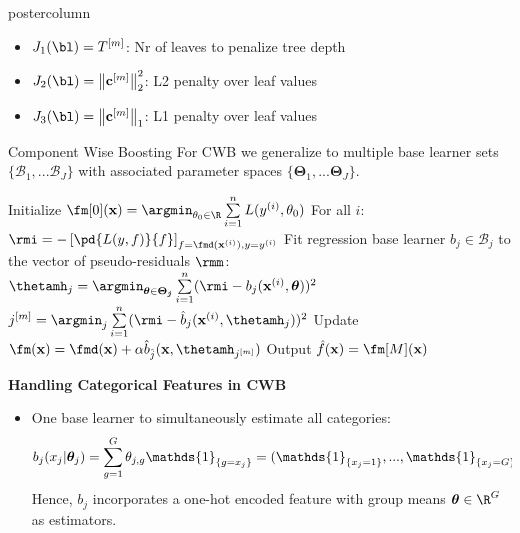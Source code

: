 \documentclass{beamer}
\newlength{\columnheight} %
\begin{document}
\begin{frame}[fragile]{}
\begin{columns}
\begin{column}{.31\textwidth}
\begin{beamercolorbox}[center]{postercolumn}
\begin{minipage}{.98\textwidth}
\parbox[t][\columnheight]{\textwidth}{
\begin{myblock}{}
\begin{itemize}[$\bullet$] 
  \setlength{\itemindent}{+.3in}
    \item $J_1(\bl) = T^{[m]}$:  Nr of leaves to penalize tree depth
    \item $J_2(\bl) = \left\|\mathbf{c}^{[m]}\right\|^2_2$:  L2 penalty over leaf values 
    \item $J_3(\bl) = \left\|\mathbf{c}^{[m]}\right\|_1$: L1 penalty over leaf values 
  \end{itemize}

\end{myblock}

\begin{myblock}{Component Wise Boosting}
For CWB we generalize to multiple base learner sets $\{ \mathcal{B}_1, ... \mathcal{B}_J \}$ with associated parameter spaces
$\{ \bm{\Theta}_1, ... \bm{\Theta}_J \}$.


\begin{algorithm}[H]
  \begin{center}
  \caption{Componentwise Gradient Boosting.}
    \begin{algorithmic}[1]
      \State Initialize $\fm[0](\xv) = \argmin_{\theta_0\in\R} \sum  \limits_{i=1}^n L(\yi, \theta_0)$
        \State For all $i$: $\rmi = -\left[\pd{L(y, f)}{f}\right]_{f=\fmd(\xi),y=\yi}$
          \State Fit regression base learner $b_j \in \mathcal{B}_j$ to the vector of pseudo-residuals $\rmm$:
          \State $\thetamh_j = \argmin_{\thetav \in \bm{\Theta_j}} \sum  \limits_{i=1}^n
          (\rmi - b_j(\xi, \thetav))^2$
        \EndFor
        \State $j^{[m]} = \argmin_{j} \sum  \limits_{i=1}^n (\rmi - \hat{b}_j(\xi, \thetamh_j))^2$
        \State Update $\fm(\xv) = \fmd(\xv) + \alpha \hat{b}_{\hat{j}}(\xv, \thetamh_{j^{[m]}})$
      \EndFor
      \State Output $\fh(\xv) = \fm[M](\xv)$
    \end{algorithmic}
    \end{center}
\end{algorithm}

\begin{codebox}
  \textbf{Handling Categorical Features in CWB}
\end{codebox}
\begin{itemize}[$\bullet$] 
  \setlength{\itemindent}{+.3in}
    \item 
        One base learner to simultaneously estimate all categories: 
        $$b_j(x_j | \thetav_j) = \sum_{g=1}^G \theta_{j,g}\mathds{1}_{\{g = x_j\}} = (\mathds{1}_{\{x_j = 1\}}, ..., \mathds{1}_{\{x_j = G\}}) \thetav_j$$
        Hence, $b_j$ incorporates a one-hot encoded feature with group means $\thetav\in\R^G$ as estimators. 
    

\end{itemize}
\end{myblock}}
\end{minipage}
\end{beamercolorbox}
\end{column}
\end{columns}
\end{frame}
\end{document}
